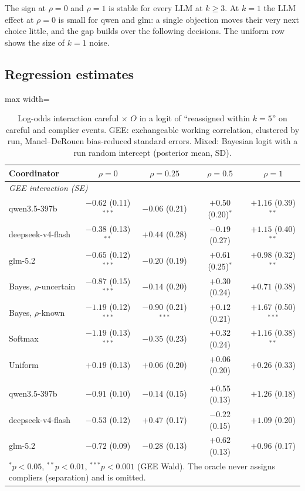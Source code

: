 \documentclass[11pt,letterpaper]{article}
\numberwithin{equation}{section}
\numberwithin{table}{section}
\numberwithin{figure}{section}
\numberwithin{algorithm}{section}
\begin{document}
\noindent The sign at $\rho=0$ and $\rho=1$ is stable for every LLM at $k\ge3$. At $k=1$ the LLM effect at $\rho=0$ is small for qwen and glm: a single objection moves their very next choice little, and the gap builds over the following decisions. The uniform row shows the size of $k=1$ noise.

\subsection{Regression estimates}

\begin{table}[h]
\centering\small
\caption{Log-odds interaction careful $\times$ $O$ in a logit of ``reassigned within $k=5$'' on careful and complier events. GEE: exchangeable working correlation, clustered by run, Mancl--DeRouen bias-reduced standard errors. Mixed: Bayesian logit with a run random intercept (posterior mean, SD).}
\label{tab:gee}
\begin{adjustbox}{max width=\linewidth}
\begin{tabular}{lcccc}
\toprule
Coordinator & $\rho=0$ & $\rho=0.25$ & $\rho=0.5$ & $\rho=1$ \\
\midrule
\multicolumn{5}{l}{\emph{GEE interaction (SE)}} \\
qwen3.5-397b & $-0.62$ (0.11)$^{***}$ & $-0.06$ (0.21) & $+0.50$ (0.20)$^{*}$ & $+1.16$ (0.39)$^{**}$ \\
deepseek-v4-flash & $-0.38$ (0.13)$^{**}$ & $+0.44$ (0.28) & $-0.19$ (0.27) & $+1.15$ (0.40)$^{**}$ \\
glm-5.2 & $-0.65$ (0.12)$^{***}$ & $-0.20$ (0.19) & $+0.61$ (0.25)$^{*}$ & $+0.98$ (0.32)$^{**}$ \\
Bayes, $\rho$-uncertain & $-0.87$ (0.15)$^{***}$ & $-0.14$ (0.20) & $+0.30$ (0.24) & $+0.71$ (0.38) \\
Bayes, $\rho$-known & $-1.19$ (0.12)$^{***}$ & $-0.90$ (0.21)$^{***}$ & $+0.12$ (0.21) & $+1.67$ (0.50)$^{***}$ \\
Softmax & $-1.19$ (0.13)$^{***}$ & $-0.35$ (0.23) & $+0.32$ (0.24) & $+1.16$ (0.38)$^{**}$ \\
Uniform & $+0.19$ (0.13) & $+0.06$ (0.20) & $+0.06$ (0.20) & $+0.26$ (0.33) \\
\addlinespace
\multicolumn{5}{l}{\emph{Mixed logit interaction (posterior SD)}} \\
qwen3.5-397b & $-0.91$ (0.10) & $-0.14$ (0.15) & $+0.55$ (0.13) & $+1.26$ (0.18) \\
deepseek-v4-flash & $-0.53$ (0.12) & $+0.47$ (0.17) & $-0.22$ (0.15) & $+1.09$ (0.20) \\
glm-5.2 & $-0.72$ (0.09) & $-0.28$ (0.13) & $+0.62$ (0.13) & $+0.96$ (0.17) \\
\bottomrule
\multicolumn{5}{l}{\scriptsize $^{*}p<0.05$, $^{**}p<0.01$, $^{***}p<0.001$ (GEE Wald). The oracle never assigns compliers (separation) and is omitted.}
\end{tabular}
\end{adjustbox}
\end{table}
\end{document}
